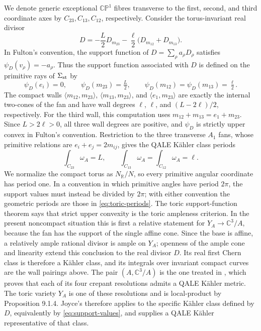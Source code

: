 \documentclass[11pt]{article}
\theoremstyle{remark}\newtheorem{remark}[theorem]{Remark}
\newcommand{\R}{\mathbb R}
\newcommand{\C}{\mathbb C}
\newcommand{\CP}{\mathbb {CP}}
\begin{document}
We denote generic exceptional $\CP^1$ fibres transverse to the first,
second, and third coordinate axes by $C_{23},C_{13},C_{12}$,
respectively.  Consider the torus-invariant real divisor
\[
 D=-\frac L2D_{m_{23}}
   -\frac\ell2\bigl(D_{m_{12}}+D_{m_{13}}\bigr).
\]
In Fulton's convention, the support function of
$D=\sum_\rho a_\rho D_\rho$ satisfies
$\psi_D(v_\rho)=-a_\rho$.  Thus the support function associated with $D$
is defined on the primitive rays of $\Sigma_{\rm st}$ by
\begin{equation}\label{eq:support-values}
\psi_D(e_i)=0,\qquad \psi_D(m_{23})=\tfrac L2,\qquad
\psi_D(m_{12})=\psi_D(m_{13})=\tfrac\ell2.
\end{equation}
The compact walls
$\langle m_{12},m_{23}\rangle$,
$\langle m_{13},m_{23}\rangle$, and
$\langle e_1,m_{23}\rangle$ are exactly the internal two-cones of the fan
and have wall degrees $\ell$, $\ell$, and $(L-2\ell)/2$, respectively.
For the third wall, this computation uses
$m_{12}+m_{13}=e_1+m_{23}$.  Since $L>2\ell>0$, all three wall degrees are
positive, and $\psi_D$ is strictly upper convex in Fulton's convention.
Restriction to the three
transverse $A_1$ fans, whose primitive relations are
$e_i+e_j=2m_{ij}$, gives the QALE K\"ahler class periods
\begin{equation}\label{eq:toric-periods}
\int_{C_{23}}\omega_A=L,\qquad
\int_{C_{13}}\omega_A=\int_{C_{12}}\omega_A=\ell.
\end{equation}
We normalize the compact torus as $N_{\R}/N$, so every primitive angular
coordinate has period one.  In a convention in which primitive angles
have period $2\pi$, the support values must instead be divided by $2\pi$;
with either convention the geometric periods are those in
\eqref{eq:toric-periods}.  The toric support-function theorem
\cite[\S3.4]{Fulton} says
that strict upper convexity is the toric ampleness criterion.  In the
present noncompact situation this is first a relative statement for
$Y_A\to\C^3/A$, because the fan has the support of the single affine cone.
Since the base is affine, a relatively ample rational divisor is ample on
$Y_A$; openness of the ample cone and linearity extend this conclusion to
the real divisor $D$.  Its real first Chern class is therefore a K\"ahler
class, and its integrals over invariant compact curves are the wall
pairings above.  The pair $(A,\C^3/A)$ is the one treated
in \cite[Example 9.3.6]{JoyceBook}, which proves that each of its four
crepant resolutions admits a QALE K\"ahler metric.  The toric variety
$Y_A$ is one of these resolutions and is local-product by Proposition
9.1.4.  Joyce's \cite[Theorem 9.4.7]{JoyceBook} therefore applies to the
specific K\"ahler class defined by $D$, equivalently by
\eqref{eq:support-values}, and supplies
a QALE K\"ahler representative of that class.
\end{document}
